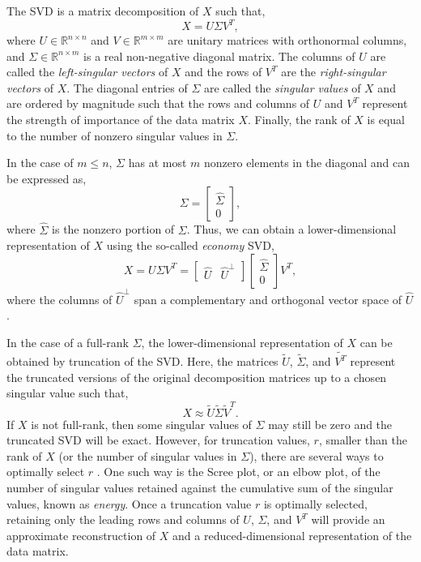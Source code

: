 \documentclass[a4paper,fleqn,12pt]{article}
\begin{document}
The SVD is a matrix decomposition of $X$ such that,
\begin{equation}
    X = U\Sigma V^T ,
\end{equation}
where $U\in\mathbb{R}^{n\times n}$ and $V\in\mathbb{R}^{m\times m}$ are unitary matrices with orthonormal columns, and $\Sigma\in\mathbb{R}^{n\times m}$ is a real non-negative diagonal matrix. The columns of $U$ are called the \emph{left-singular vectors} of $X$ and the rows of $V^T$ are the \emph{right-singular vectors} of $X$. The diagonal entries of $\Sigma$ are called the \emph{singular values} of $X$ and are ordered by magnitude such that the rows and columns of $U$ and $V^T$ represent the strength of importance of the data matrix $X$. Finally, the rank of $X$ is equal to the number of nonzero singular values in $\Sigma$.

In the case of $m\leq n$, $\Sigma$ has at most $m$ nonzero elements in the diagonal and can be expressed as,
\begin{equation}
    \Sigma = \begin{bmatrix} \hat{\Sigma} \\ 0 \end{bmatrix} ,
\end{equation}
where $\hat{\Sigma}$ is the nonzero portion of $\Sigma$. Thus, we can obtain a lower-dimensional representation of $X$ using the so-called \emph{economy} SVD,
\begin{equation}
    X = U\Sigma V^T = 
    \begin{bmatrix} \hat{U} & \hat{U}^\perp \end{bmatrix}
    \begin{bmatrix} \hat{\Sigma} \\ 0 \end{bmatrix}
    V^T ,
\end{equation}
where the columns of $\hat{U}^\perp$ span a complementary and orthogonal vector space of $\hat{U}$.

In the case of a full-rank $\Sigma$, the lower-dimensional representation of $X$ can be obtained by truncation of the SVD. Here, the matrices $\tilde{U}$, $\tilde{\Sigma}$, and $\tilde{V^T}$ represent the truncated versions of the original decomposition matrices up to a chosen singular value such that,
\begin{equation}
    X \approx \tilde{U}\tilde{\Sigma}\tilde{V}^T .
\end{equation}
If $X$ is not full-rank, then some singular values of $\Sigma$ may still be zero and the truncated SVD will be exact. However, for truncation values, $r$, smaller than the rank of $X$ (or the number of singular values in $\Sigma$), there are several ways to optimally select $r$ \cite{hansen1990truncated}. One such way is the Scree plot, or an elbow plot, of the number of singular values retained against the cumulative sum of the singular values, known as \emph{energy}. Once a truncation value $r$ is optimally selected, retaining only the leading rows and columns of $U$, $\Sigma$, and $V^T$ will provide an approximate reconstruction of $X$ and a reduced-dimensional representation of the data matrix.
\end{document}
